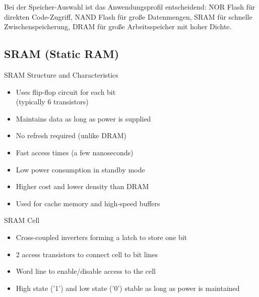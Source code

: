 \begin{remark}
    Bei der Speicher-Auswahl ist das Anwendungsprofil entscheidend: NOR Flash für direkten Code-Zugriff, NAND Flash für große Datenmengen, SRAM für schnelle Zwischenspeicherung, DRAM für große Arbeitsspeicher mit hoher Dichte.
\end{remark}

\raggedcolumns
\columnbreak

\subsection{SRAM (Static RAM)}


\begin{concept}{SRAM Structure and Characteristics}
\begin{itemize}
    \item Uses flip-flop circuit for each bit \\ (typically 6 transistors)
    \item Maintains data as long as power is supplied
    \item No refresh required (unlike DRAM)
    \item Fast access times (a few nanoseconds)
    \item Low power consumption in standby mode
    \item Higher cost and lower density than DRAM
    \item Used for cache memory and high-speed buffers
\end{itemize}
\end{concept}

\begin{definition}{SRAM Cell}
\begin{itemize}
    \item Cross-coupled inverters forming a latch to store one bit
    \item 2 access transistors to connect cell to bit lines
    \item Word line to enable/disable access to the cell
    \item High state ('1') and low state ('0') stable as long as power is maintained
\end{itemize}
\end{definition}

\multend

